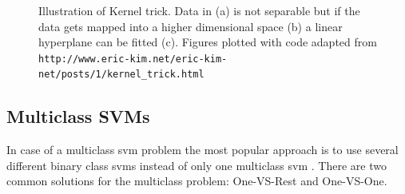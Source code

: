 \begin{figure}
	\centering
	\caption{Illustration of Kernel trick. Data in {(a)} is not separable but if the data gets mapped into a higher dimensional space {(b)} a linear hyperplane can be fitted {(c)}. Figures plotted with code adapted from \texttt{http://www.eric-kim.net/eric-kim-net/posts/1/kernel\_trick.html}}
	\label{fig:svmKernelTrick}
\end{figure}

\subsection*{Multiclass SVMs}
\label{subsec:svmMulticlass}
In case of a multiclass \gls{svm} problem the most popular approach is to use several different binary class \glspl{svm} instead of only one multiclass \gls{svm} \cite{Hsu2002, Duan2005, Thome2012}. There are two common solutions for the multiclass problem: One-VS-Rest and One-VS-One.


